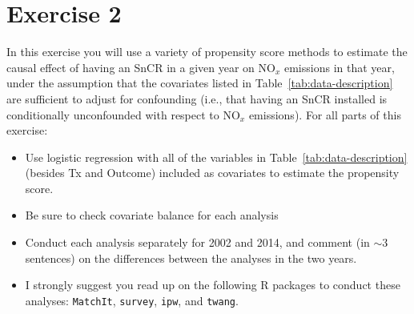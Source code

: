 \documentclass[11pt,letter]{article}
\begin{document}
\section{Exercise 2}

\begin{quoting}
  In this exercise you will use a variety of propensity score methods
  to estimate the causal effect of having an SnCR in a given year on
  $\text{NO}_x$ emissions in that year, under the assumption that the
  covariates listed in Table~\ref{tab:data-description} are sufficient
  to adjust for confounding (i.e., that having an SnCR installed is
  conditionally unconfounded with respect to $\text{NO}_x$
  emissions). For all parts of this exercise:
  \begin{itemize}
  \item Use logistic regression with all of the variables in
    Table~\ref{tab:data-description} (besides Tx and Outcome) included
    as covariates to estimate the propensity score.
  \item Be sure to check covariate balance for each analysis
  \item Conduct each analysis separately for 2002 and 2014, and
    comment (in $\sim$3 sentences) on the differences between the analyses
    in the two years. 
  \item I strongly suggest you read up on the following \textsf{R}
    packages to conduct these analyses: \texttt{MatchIt},
    \texttt{survey}, \texttt{ipw}, and \texttt{twang}.
  \end{itemize}
\end{quoting}
\end{document}

